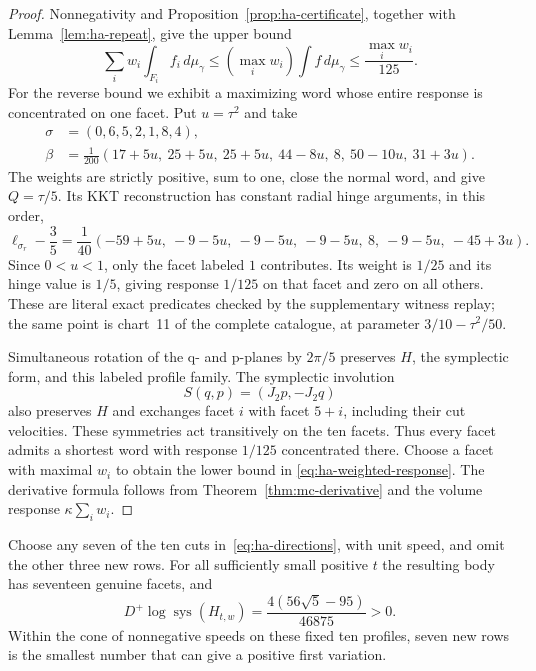 \begin{proof}
Nonnegativity and Proposition~\ref{prop:ha-certificate}, together with
Lemma~\ref{lem:ha-repeat}, give the upper bound
\[
 \sum_iw_i\int_{F_i}f_i\,d\mu_\gamma
 \leq(\max_iw_i)\int f\,d\mu_\gamma
 \leq\frac{\max_iw_i}{125}.
\]
For the reverse bound we exhibit a maximizing word whose entire response
is concentrated on one facet. Put $u=\tau^2$ and take
\begin{align*}
 \sigma&=(0,6,5,2,1,8,4),\\
 \beta&=\frac1{200}
 (17+5u,\ 25+5u,\ 25+5u,\ 44-8u,\ 8,\ 50-10u,\ 31+3u).
\end{align*}
The weights are strictly positive, sum to one, close the normal word, and
give $Q=\tau/5$. Its KKT reconstruction has constant radial hinge arguments,
in this order,
\[
 \ell_{\sigma_r}-\frac35
 =\frac1{40}(-59+5u,\ -9-5u,\ -9-5u,\ -9-5u,\
                       8,\ -9-5u,\ -45+3u).
\]
Since $0<u<1$, only the facet labeled $1$ contributes. Its weight is
$1/25$ and its hinge value is $1/5$, giving response $1/125$ on that facet
and zero on all others. These are literal exact predicates checked by the
supplementary witness replay; the same point is chart~11 of the complete
catalogue, at parameter $3/10-\tau^2/50$.

Simultaneous rotation of the q- and p-planes by $2\pi/5$ preserves $H$,
the symplectic form, and this labeled profile family. The symplectic
involution
\[
 S(q,p)=(J_2p,-J_2q)
\]
also preserves $H$ and exchanges facet $i$ with facet $5+i$, including
their cut velocities. These symmetries act transitively on the ten facets.
Thus every facet admits a shortest word with response $1/125$ concentrated
there. Choose a facet with maximal $w_i$ to obtain the lower bound in
\eqref{eq:ha-weighted-response}. The derivative formula follows from
Theorem~\ref{thm:mc-derivative} and the volume response
$\kappa\sum_iw_i$.
\end{proof}

\begin{corollary}\label{cor:ha-seventeen}
Choose any seven of the ten cuts in~\eqref{eq:ha-directions}, with unit
speed, and omit the other three new rows. For all sufficiently small
positive $t$ the resulting body has seventeen genuine facets, and
\[
 D^+\log\operatorname{sys}(H_{t,w})
 =\frac{4(56\sqrt5-95)}{46875}>0.
\]
Within the cone of nonnegative speeds on these fixed ten profiles, seven
new rows is the smallest number that can give a positive first variation.
\end{corollary}

